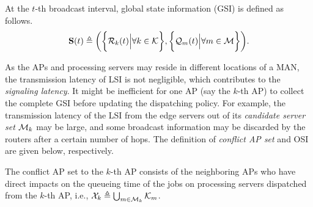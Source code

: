 %
\begin{definition}
    At the $t$-th broadcast interval, global state information (GSI) is defined as follows.
    {\small
    \begin{align}
        \mathbf{S}(t) \triangleq
            \bigg(
                \bigg\{\mathcal{R}_{k}(t) \Big| \forall k\in\mathcal{K}\bigg\},
                \bigg\{\mathcal{Q}_{m}(t) \Big| \forall m\in\mathcal{M}\bigg\}
            \bigg).
    \end{align}
    }%
\end{definition}

%
As the APs and processing servers may reside in different locations of a MAN, the transmission latency of LSI is not negligible, which contributes to the \emph{signaling latency}.
It might be inefficient for one AP (say the $k$-th AP) to collect the complete GSI before updating the dispatching policy.
For example, the transmission latency of the LSI from the edge servers out of its \emph{candidate server set} $\mathcal{M}_{k}$ may be large, and some broadcast information may be discarded by the routers after a certain number of hops.
%
The definition of \emph{conflict AP set} and OSI are given below, respectively.
\begin{definition}
    The conflict AP set to the $k$-th AP consists of the neighboring APs who have direct impacts on the queueing time of the jobs on processing servers dispatched from the $k$-th AP, i.e., $ \mathcal{X}_{k} \triangleq \bigcup_{m\in\mathcal{M}_{k}} \mathcal{K}_{m}$.
\end{definition}


